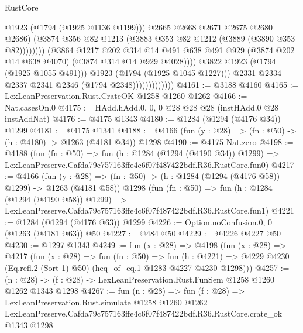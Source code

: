 \begin{lexlean}{RustCore}
\begin{coremodule}
                                                @1923
                                                (@1794 (@1925 @1136 @1199)))
                                              @2665
                                              @2668
                                              @2671
                                              @2675
                                              @2680
                                              @2686)
                                            (@3874
                                              @356
                                              @82
                                              @1213
                                              (@3883 @353 @82 @1212 (@3889 (@3890 @353 @82))))))))
                                    (@3864
                                      @1217
                                      @202
                                      @314
                                      @14
                                      @491
                                      @638
                                      @491
                                      @929
                                      (@3874 @202 @14 @638 @4070)
                                      (@3874 @314 @14 @929 @4028))))
                                @3822
                                @1923
                                (@1794 (@1925 @1055 @491)))
                              @1923
                              (@1794 (@1925 @1045 @1227)))
                            @2331
                            @2334
                            @2337
                            @2341
                            @2346
                            (@1794 @2348)))))))))))))
@4161 := @3188 @4160
@4165 := LexLeanPreservation.Rust.CrateOK @1258 @1260 @1262
@4166 := Nat.casesOn.{0}
@4175 := HAdd.hAdd.{0, 0, 0} @28 @28 @28 (instHAdd.{0} @28 instAddNat)
@4176 := @4175 @1343
@4180 := @1284 (@1294 (@4176 @34)) @1299
@4181 := @4175 @1341
@4188 := @4166 (fun (y : @28) => (fn : @50) -> (h : @4180) -> @1263 (@4181 @34)) @1298
@4190 := @4175 Nat.zero
@4198 := @4188
    (fun (fn : @50) =>
    fun (h : @1284 (@1294 (@4190 @34)) @1299) =>
    LexLeanPreserve.Cafda79c757163ffe4c6f07f487422bdf.R36.RustCore.fun0)
@4217 := @4166
    (fun (y : @28) => (fn : @50) -> (h : @1284 (@1294 (@4176 @58)) @1299) -> @1263 (@4181 @58))
    @1298
    (fun (fn : @50) =>
    fun (h : @1284 (@1294 (@4190 @58)) @1299) =>
    LexLeanPreserve.Cafda79c757163ffe4c6f07f487422bdf.R36.RustCore.fun1)
@4221 := @1284 (@1294 (@4176 @63)) @1299
@4226 := Option.noConfusion.{0, 0} (@1263 (@4181 @63)) @50
@4227 := @484 @50
@4229 := @4226 @4227 @50
@4230 := @1297 @1343
@4249 := fun (x : @28) =>
  @4198
    (fun (x : @28) =>
    @4217
      (fun (x : @28) =>
      fun (fn : @50) =>
      fun (h : @4221) =>
      @4229 @4230 (Eq.refl.{2} (Sort 1) @50) (heq_of_eq.{1} @1283 @4227 @4230 @1298)))
@4257 := (n : @28) -> (f : @28) -> LexLeanPreservation.Rust.FunSem @1258 @1260 @1262 @1343 @1298
@4267 := fun (n : @28) =>
  fun (f : @28) =>
  LexLeanPreservation.Rust.simulate
    @1258
    @1260
    @1262
    LexLeanPreserve.Cafda79c757163ffe4c6f07f487422bdf.R36.RustCore.crate_ok
    @1343
    @1298
\end{coremodule}
\end{lexlean}
